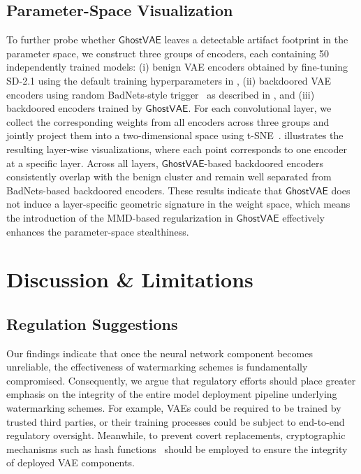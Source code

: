 \documentclass[letterpaper,twocolumn,10pt]{article}
\newcommand{\mg}{$\mathsf{GhostVAE}$\xspace}
\begin{document}
\subsection{Parameter-Space Visualization}
\label{sec:56para_visual}
To further probe whether \mg leaves a detectable artifact footprint in the parameter space, we construct three groups of encoders, each containing 50 independently trained models: (i) benign VAE encoders obtained by fine-tuning SD-2.1 using the default training hyperparameters in , (ii) backdoored VAE encoders using random BadNets-style trigger~\cite{gu2017badnets} as described
in , and (iii) backdoored encoders trained by \mg.
For each convolutional layer, we collect the corresponding weights from all encoders across three groups and jointly project them into a two-dimensional space using t-SNE~\cite{DBLP:journals/jstatsoft/PolicarSZ24}.
 illustrates the resulting layer-wise visualizations, where each point corresponds to one encoder at a specific layer.
Across all layers, \mg-based backdoored encoders consistently overlap with the benign cluster and remain well separated from BadNets-based backdoored encoders.
These results indicate that \mg does not induce a layer-specific geometric signature in the weight space, which means the introduction of the MMD-based regularization in \mg effectively enhances the parameter-space stealthiness.




\section{Discussion \& Limitations}
\label{sec:discussian_and_limitations}

\subsection{Regulation Suggestions}
\label{sec:dis_regulation}
Our findings indicate that once the neural network component becomes unreliable, the effectiveness of watermarking schemes is fundamentally compromised.
Consequently, we argue that regulatory efforts should place greater emphasis on the integrity of the entire model deployment pipeline underlying watermarking schemes.
For example, VAEs could be required to be trained by trusted third parties, or their training processes could be subject to end-to-end regulatory oversight.
Meanwhile, to prevent covert replacements, cryptographic mechanisms such as hash functions~\cite{rfc1321} should be employed to ensure the integrity of deployed VAE components.
\end{document}
